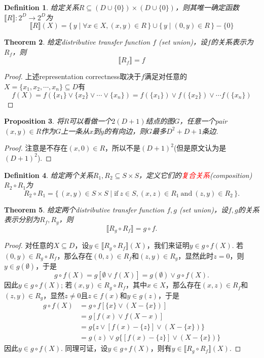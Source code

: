 \documentclass{article}
\newtheorem{theorem}{Theorem}[section]
\newtheorem{proposition}[theorem]{Proposition}
\newtheorem{definition}[theorem]{Definition}
\newcommand*{\xfunc}[4]{{#2}\colon{#3}{#1}{#4}}
\newcommand*{\func}[3]{\xfunc{\to}{#1}{#2}{#3}}
\newcommand\Set[2]{\{\,#1\mid#2\,\}} %
\newcommand{\redt}[1]{\textcolor{red}{#1}}
\begin{document}
\begin{definition}
\rm 给定关系$R \subseteq (D \cup \{0\}) \times (D \cup \{0\})$，则其唯一确定函数$\func{\llbracket R \rrbracket}{2^D}{2^D}$为
$$
\llbracket R \rrbracket(X) = \Set{y}{\forall x \in X, (x,y) \in R} \cup \Set{y}{(0,y) \in R } - \{0\}
$$
\end{definition}

\begin{theorem}\label{representation correctness}
\rm 给定distributive transfer function $f$ (set union)，设$f$的关系表示为$R_f$，则
$$
\llbracket R_f \rrbracket = f
$$
\end{theorem}

\begin{proof}
\rm 上述representation correctness取决于$f$满足对任意的$X = \{x_1,x_2,\cdots,x_n\} \subseteq D$有
$$
f(X) = f(\{x_1\} \vee \{x_2\} \vee \cdots \vee \{x_n\}) = f(\{x_1\}) \vee f(\{x_2\}) \vee \cdots f(\{x_n\})
$$ 
\end{proof}


\begin{proposition}
\rm 将$R$可以看做一个$2(D+1)$结点的图$G$，任意一个pair $(x,y) \in R$作为$G$上一条从$x$到$y$的有向边，则$G$最多$D^2 + D +1$条边.
\end{proposition}

\begin{proof}
注意是不存在$(x,0) \in R$，所以不是$(D+1)^2$(但是原文认为是$(D+1)^2$).
\end{proof}


\begin{definition}
\rm 给定两个关系$R_1,R_2 \subseteq S \times S$，定义它们的\redt{复合关系}(composition)$R_2 \circ R_1$为
$$
R_2 \circ R_1 = \Set{(x,y) \in S \times S}{\text{if}~ z \in S, (x,z) \in R_1~\text{and}~(z,y) \in R_2}.
$$
\end{definition}

\begin{theorem}
\rm 给定两个distributive transfer function $f,g$ (set union)，设$f,g$的关系表示分别为$R_f,R_g$，则
$$
\llbracket R_g \circ R_f \rrbracket = g \circ f. 
$$
\end{theorem}

\begin{proof}
\rm 对任意的$X \subseteq D$，设$y \in \llbracket R_g \circ R_f \rrbracket(X)$，我们来证明$y \in g \circ f(X)$. 若$(0,y) \in R_g \circ R_f$，那么存在$(0,z) \in R_f$和$(z,y) \in R_g$，显然此时$z = 0$，则$y \in g(\emptyset)$，于是
$$
g\circ f(X) = g[\emptyset \vee f(X)] = g(\emptyset) \vee g\circ f(X). 
$$ 
因此$y \in g\circ f(X)$; 若$(x,y) \in R_g \circ R_f$，其中$x \in X$，那么存在$(x,z) \in R_f$和$(z,y) \in R_g$，显然$z \neq 0$且$z \in f(x)$和$y \in g(z)$，于是
$$
\begin{aligned}
g \circ f(X) &= g \circ f[\{x\} \vee (X - \{x\})]\\ &
= g[f(x) \vee f(X - {x})]\\ 
&= g \{z  \vee [f(x) - \{z\}] \vee  (X - \{x\})\} \\
&= g(z) \vee g\{[f(x) - \{z\}] \vee  (X - \{x\})\}
\end{aligned}
$$
因此$y \in g \circ f(X)$. 同理可证，设$y \in g \circ f(X)$，则有$y \in \llbracket R_g \circ R_f \rrbracket(X)$. 
\end{proof}
\end{document}
